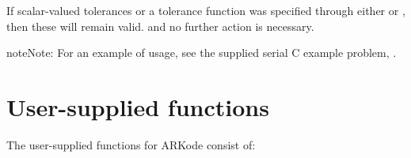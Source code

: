 \documentclass[letterpaper,10pt,english]{sphinxmanual}
\begin{document}
If scalar-valued tolerances or a tolerance function was specified
through either {\hyperref[c_interface/User_callable:ARKodeSStolerances]{}} or
{\hyperref[c_interface/User_callable:ARKodeWFtolerances]{}}, then these will remain valid. and no
further action is necessary.

\begin{notice}{note}{Note:}
For an example of {\hyperref[c_interface/User_callable:ARKodeResize]{}} usage, see the
supplied serial C example problem, .
\end{notice}


\section{User-supplied functions}
\label{c_interface/User_supplied:cinterface-usersupplied}\label{c_interface/User_supplied:user-supplied-functions}\label{c_interface/User_supplied::doc}
The user-supplied functions for ARKode consist of:
\end{document}
